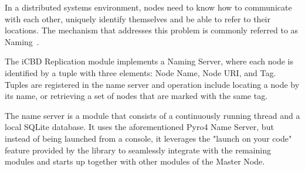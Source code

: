 



In a distributed systems environment, nodes need to know how to communicate with each other, uniquely identify themselves and be able to refer to their locations. The mechanism that addresses this problem is commonly referred to as Naming~\cite{tanenbaum_2006}.

The iCBD Replication module implements a Naming Server, where each node is identified by a tuple with three elements: Node Name, Node URI, and Tag. Tuples are registered in the name server and operation include locating a node by its name, or retrieving a set of nodes that are marked with the same tag.

The name server is a module that consists of a continuously running thread and a local SQLite database. It uses the aforementioned Pyro4 Name Server, but instead of being launched from a console, it leverages the "launch on your code" feature provided by the library to seamlessly integrate with the remaining modules and starts up together with other modules of the Master Node.

